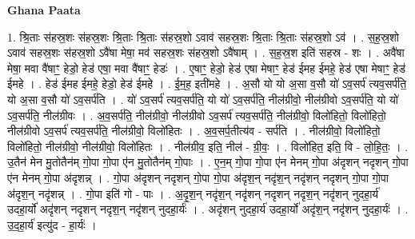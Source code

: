 \documentclass[17pt]{extarticle}
\begin{document}
\textbf{Ghana Paata } \newline

1. श्रि॒ताः स॑हस्र॒शः स॑हस्र॒शः श्रि॒ताः श्रि॒ताः स॑हस्र॒शो ऽवाव॑ सहस्र॒शः श्रि॒ताः श्रि॒ताः स॑हस्र॒शो ऽव॑ । . स॒ह॒स्र॒शो ऽवाव॑ सहस्र॒शः स॑हस्र॒शो ऽवै॑षा मेषा॒ मव॑ सहस्र॒शः स॑हस्र॒शो ऽवै॑षाम् । . स॒ह॒स्र॒श इति॑ सहस्र - शः । . अवै॑षा मेषा॒ मवा वै॑षाꣳ॒॒ हेडो॒ हेड॑ एषा॒ मवा वै॑षाꣳ॒॒ हेडः॑ । . ए॒षाꣳ॒॒ हेडो॒ हेड॑ एषा मेषाꣳ॒॒ हेड॑ ईमह ईमहे॒ हेड॑ एषा मेषाꣳ॒॒ हेड॑ ईमहे । . हेड॑ ईमह ईमहे॒ हेडो॒ हेड॑ ईमहे । . ई॒म॒ह॒ इती॑महे । . अ॒सौ यो यो अ॒सा व॒सौ यो॑ ऽव॒सर्प॑ त्यव॒सर्प॑ति॒ यो अ॒सा व॒सौ यो॑ ऽव॒सर्प॑ति । . यो॑ ऽव॒सर्प॑ त्यव॒सर्प॑ति॒ यो यो॑ ऽव॒सर्प॑ति॒ नील॑ग्रीवो॒ नील॑ग्रीवो ऽव॒सर्प॑ति॒ यो यो॑ ऽव॒सर्प॑ति॒ नील॑ग्रीवः । . अ॒व॒सर्प॑ति॒ नील॑ग्रीवो॒ नील॑ग्रीवो ऽव॒सर्प॑ त्यव॒सर्प॑ति॒ नील॑ग्रीवो॒ विलो॑हितो॒ विलो॑हितो॒ नील॑ग्रीवो ऽव॒सर्प॑ त्यव॒सर्प॑ति॒ नील॑ग्रीवो॒ विलो॑हितः । . अ॒व॒सर्प॒तीत्य॑व - सर्प॑ति । . नील॑ग्रीवो॒ विलो॑हितो॒ विलो॑हितो॒ नील॑ग्रीवो॒ नील॑ग्रीवो॒ विलो॑हितः । . नील॑ग्रीव॒ इति॒ नील॑ - ग्री॒वः॒ । . विलो॑हित॒ इति॒ वि - लो॒हि॒तः॒ । . उ॒तैन॑ मेन मु॒तोतैन॑म् गो॒पा गो॒पा ए॑न मु॒तोतैन॑म् गो॒पाः । . ए॒न॒म् गो॒पा गो॒पा ए॑न मेनम् गो॒पा अ॑दृशन् नदृशन् गो॒पा ए॑न मेनम् गो॒पा अ॑दृशन्न् । . गो॒पा अ॑दृशन् नदृशन् गो॒पा गो॒पा अ॑दृश॒न् नदृ॑श॒न् नदृ॑शन् नदृशन् गो॒पा गो॒पा अ॑दृश॒न् नदृ॑शन्न् । . गो॒पा इति॑ गो - पाः । . अ॒दृ॒श॒न् नदृ॑श॒न् नदृ॑शन् नदृशन् नदृश॒न् नदृ॑शन् नुदहा॒र्य॑ उदहा॒र्यो॑ अदृ॑शन् नदृशन् नदृश॒न् नदृ॑शन् नुदहा॒र्यः॑ । . अदृ॑शन् नुदहा॒र्य॑ उदहा॒र्यो॑ अदृ॑श॒न् नदृ॑शन् नुदहा॒र्यः॑ । . उ॒द॒हा॒र्य॑ इत्यु॑द - हा॒र्यः॑ । \newline
\end{document}
